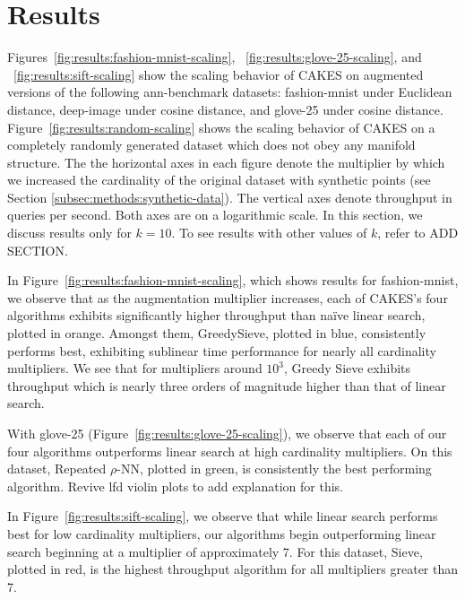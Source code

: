\section{Results}
\label{sec:results}


Figures~\ref{fig:results:fashion-mnist-scaling}, ~\ref{fig:results:glove-25-scaling}, and ~\ref{fig:results:sift-scaling} show the scaling behavior of CAKES on augmented versions of the following ann-benchmark datasets: fashion-mnist under Euclidean distance, deep-image under cosine distance, and glove-25 under cosine distance. 
Figure~\ref{fig:results:random-scaling} shows the scaling behavior of CAKES on a completely randomly generated dataset which does not obey any manifold structure. 
The the horizontal axes in each figure denote the multiplier by which we increased the cardinality of the original dataset with synthetic points (see Section \ref{subsec:methods:synthetic-data}). 
The vertical axes denote throughput in queries per second. Both axes are on a logarithmic scale. In this section, we discuss results only for $k = 10$. 
To see results with other values of $k$, refer to {\color{red} ADD SECTION}.

In Figure~\ref{fig:results:fashion-mnist-scaling}, which shows results for fashion-mnist, we observe that as the augmentation multiplier increases, each of CAKES's four algorithms exhibits significantly higher throughput than na\"{i}ve linear search, plotted in orange. 
Amongst them, GreedySieve, plotted in blue, consistently performs best, exhibiting sublinear time performance for nearly all cardinality multipliers. 
We see that for multipliers around $10^3$, Greedy Sieve exhibits throughput which is nearly three orders of magnitude higher than that of linear search.


With glove-25 (Figure~\ref{fig:results:glove-25-scaling}), we observe that each of our four algorithms outperforms linear search at high cardinality multipliers. 
On this dataset, Repeated $\rho$-NN, plotted in green, is consistently the best performing algorithm. {\color{red} Revive lfd violin plots to add explanation for this.}


In Figure~\ref{fig:results:sift-scaling}, we observe that while linear search performs best for low cardinality multipliers, our algorithms begin outperforming linear search beginning at a multiplier of approximately 7. 
For this dataset, Sieve, plotted in red, is the highest throughput algorithm for all multipliers greater than 7. 

